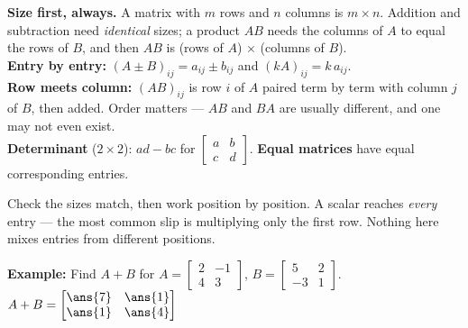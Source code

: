 \documentclass[12pt]{article}
\begin{document}

\begin{formulabox}
\textbf{Size first, always.} A matrix with $m$ rows and $n$ columns is
$m \times n$. Addition and subtraction need \emph{identical} sizes; a product
$AB$ needs the columns of $A$ to equal the rows of $B$, and then $AB$ is
(rows of $A$) $\times$ (columns of $B$).\\[3pt]
\textbf{Entry by entry:} $(A \pm B)_{ij} = a_{ij} \pm b_{ij}$ and
$(kA)_{ij} = k\,a_{ij}$.\\[3pt]
\textbf{Row meets column:} $(AB)_{ij}$ is row $i$ of $A$ paired term by term
with column $j$ of $B$, then added. Order matters --- $AB$ and $BA$ are usually
different, and one may not even exist.\\[3pt]
\textbf{Determinant} ($2 \times 2$): $ad - bc$ for
$\left[\begin{smallmatrix} a & b \\ c & d \end{smallmatrix}\right]$.
\textbf{Equal matrices} have equal corresponding entries.
\end{formulabox}


\begin{formulabox}
Check the sizes match, then work position by position. A scalar reaches
\emph{every} entry --- the most common slip is multiplying only the first row.
Nothing here mixes entries from different positions.
\end{formulabox}

\begin{examplebox}
\textbf{Example:} Find $A + B$ for
$A = \left[\begin{smallmatrix} 2 & -1 \\ 4 & 3 \end{smallmatrix}\right]$,
$B = \left[\begin{smallmatrix} 5 & 2 \\ -3 & 1 \end{smallmatrix}\right]$.
$A + B = \begin{bmatrix} \ans{7} & \ans{1} \\ \ans{1} & \ans{4} \end{bmatrix}$
\end{examplebox}
\end{document}
